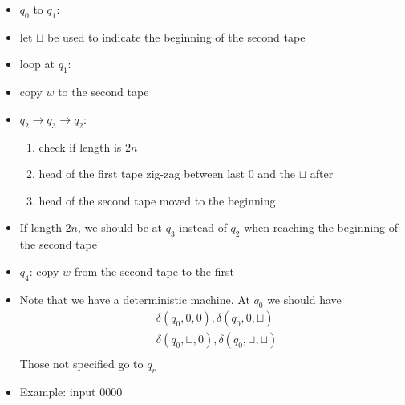 \begin{frame}[allowframebreaks]
\begin{itemize}
\item $q_0$ to $q_1$:
  
\item [] let $\sqcup$ be used to indicate the beginning of the second
  tape
\item loop at $q_1$:
\item [] copy $w$ to the second tape
\item $q_2 \rightarrow q_3 \rightarrow q_2$: 
  \begin{enumerate}
  \item check if length is $2n$    
  \item head of the first tape zig-zag between last 0 and the
    $\sqcup$ after
  \item head of the second tape moved to the beginning
\end{enumerate}

\item If length $2n$, we should be at $q_3$
instead of $q_2$ when reaching the beginning of the
second tape
\item $q_4$: copy $w$ from the second tape to the first
\item Note that we have a deterministic machine. At $q_0$ we
  should have
  \begin{equation*}
    \begin{split}
      & \delta(q_0, 0, 0), \delta(q_0, 0, \sqcup)\\
      & \delta(q_0, \sqcup, 0), \delta(q_0, \sqcup, \sqcup)\\      
    \end{split}
  \end{equation*}
Those not specified go to $q_r$
\item Example: input 0000


\end{itemize}
\end{frame}
